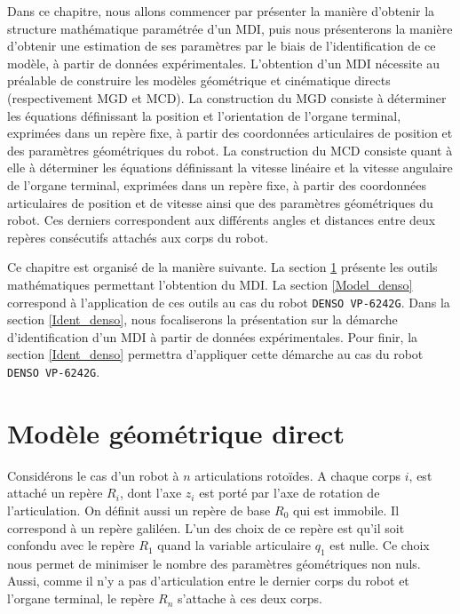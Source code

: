 \documentclass[12pt,a4paper,twoside]{report}
\begin{document}
Dans ce chapitre, nous allons commencer par présenter la manière d'obtenir la structure mathématique paramétrée d'un MDI, puis nous présenterons la manière d'obtenir une estimation de ses paramètres par le biais de l'identification de ce modèle, à partir de données expérimentales. %
L'obtention d'un MDI nécessite au préalable de construire les modèles géométrique et cinématique directs (respectivement MGD et MCD). La construction du MGD consiste à déterminer les équations définissant la position et l'orientation de l'organe terminal, exprimées dans un repère fixe, à partir des coordonnées articulaires de position et des paramètres géométriques du robot. La construction du MCD consiste quant à elle à déterminer les équations définissant la vitesse linéaire et la vitesse angulaire de l'organe terminal, exprimées dans un repère fixe, à partir des coordonnées articulaires de position et de vitesse ainsi que des paramètres géométriques du robot.
Ces derniers correspondent aux différents angles et distances entre deux repères consécutifs attachés aux corps du robot.
\par
Ce chapitre est organisé de la manière suivante. La section \ref{Model_robot} présente les outils mathématiques permettant l'obtention du MDI. La section \ref{Model_denso} correspond à l'application de ces outils au cas du robot \verb"DENSO VP-6242G". Dans la section \ref{Ident_denso}, nous focaliserons la présentation sur la démarche d'identification d'un MDI à partir de données expérimentales. Pour finir, la section \ref{Ident_denso} permettra d'appliquer cette démarche au cas du robot \verb"DENSO VP-6242G".

\section{Modèle géométrique direct}
\label{Model_robot}
Considérons le cas d'un robot à $n$ articulations rotoïdes. A chaque corps $i$, est attaché un repère $R_i$, dont l'axe $z_i$ est porté par l'axe de rotation de l'articulation. On définit aussi un repère de base $R_0$ qui est immobile. Il correspond à un repère galiléen. L'un des choix de ce repère est qu'il soit confondu avec le repère $R_1$ quand la variable articulaire $q_1$ est nulle.
Ce choix nous permet de minimiser le nombre des paramètres géométriques non nuls. Aussi, comme il n'y a pas d'articulation entre le dernier corps du robot et l'organe terminal, le repère $R_n$ s'attache à ces deux corps.
\end{document}
